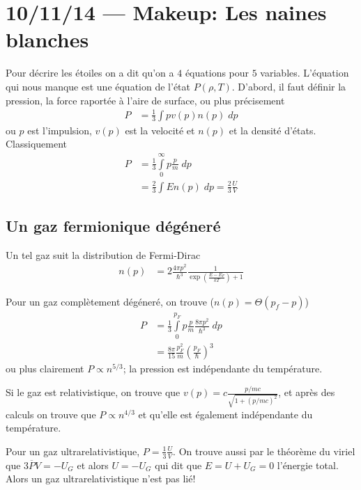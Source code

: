 \documentclass[10pt]{report}
\begin{document}
\chapter{10/11/14 --- Makeup: Les naines blanches}

Pour d\'ecrire les \'etoiles on a dit qu'on a $4$ \'equations pour $5$ variables. L'\'equation qui nous manque est une \'equation de l'\'etat $P(\rho,T)$. D'abord, il faut d\'efinir la pression, la force raport\'ee \`a l'aire de surface, ou plus pr\'ecisement
\begin{align}
    P &= \frac{1}{3}\int pv(p)n(p)\;dp
\end{align}
ou $p$ est l'impulsion, $v(p)$ est la velocit\'e et $n(p)$ et la densit\'e d'\'etats. Classiquement
\begin{align}
    P &= \frac{1}{3}\int\limits_{0}^{\infty}p\frac{p}{m}\;dp\\
    &= \frac{2}{3} \int E n(p)\;dp = \frac{2}{3}\frac{U}{V}
\end{align}

\section{Un gaz fermionique d\'eg\'ener\'e}

Un tel gaz suit la distribution de Fermi-Dirac
\begin{align}
    n(p) &= 2\frac{4\pi p^2}{\hbar^3}\frac{1}{\exp\left( \frac{E - E_F}{kT} \right) + 1}
\end{align}

Pour un gaz compl\`etement d\'eg\'ener\'e, on trouve ($n(p) = \Theta(p_f - p)$)
\begin{align}
    P &= \frac{1}{3}\int\limits_{0}^{p_F}p\frac{p}{m}\frac{8\pi p^2}{\hbar^3}\;dp\\
    &= \frac{8\pi}{15}\frac{p_F^2}{m}\left( \frac{p_F}{\hbar} \right)^3
\end{align}
ou plus clairement $P \propto n^{5/3}$; la pression est ind\'ependante du temp\'erature.

Si le gaz est relativistique, on trouve que $v(p) = c\frac{p/mc}{\sqrt{1 + (p/mc)^2}}$, et apr\`es des calculs on trouve que $P \propto n^{4/3}$ et qu'elle est \'egalement ind\'ependante du temp\'erature.

Pour un gaz ultrarelativistique, $P = \frac{1}{3}\frac{U}{V}$. On trouve aussi par le th\'eor\`eme du viriel que $3\overline{P}V = -U_G$ et alors $U = -U_G$ qui dit que $E = U + U_G = 0$ l'\'energie total. Alors un gaz ultrarelativistique n'est pas li\'e!
\end{document}

